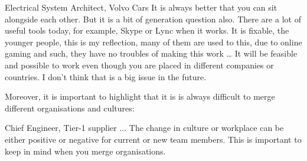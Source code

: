 \begin{aquote}{Electrical System Architect, Volvo Cars}
It is always better that you can sit alongside each other. But it is a bit of generation question also. There are a lot of useful tools today, for example, Skype or Lync when it works. It is fixable, the younger people, this is my reflection, many of them are used to this, due to online gaming and such, they have no troubles of making this work … It will be feasible and possible to work even though you are placed in different companies or countries. I don't think that is a big issue in the future.
\end{aquote}

Moreover, it is important to highlight that it is is always difficult to merge different organisations and cultures:

\begin{aquote}{Chief Engineer, Tier-1 supplier}
... The change in culture or workplace can be either positive or negative for current or new team members. This is important to keep in mind when you merge organisations.
\end{aquote}

%
%
%


%
%
%
%

